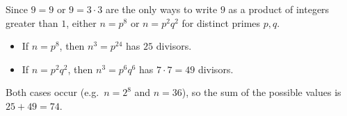 Since $9=9$ or $9=3\cdot3$ are the only ways to write $9$ as a product of integers greater than $1$, either $n=p^8$ or $n=p^2q^2$ for distinct primes $p,q$.
\begin{itemize}
\item If $n=p^8$, then $n^3=p^{24}$ has $25$ divisors.
\item If $n=p^2q^2$, then $n^3=p^6q^6$ has $7\cdot7=49$ divisors.
\end{itemize}
Both cases occur (e.g.\ $n=2^8$ and $n=36$), so the sum of the possible values is $25+49=\boxed{74}$.
